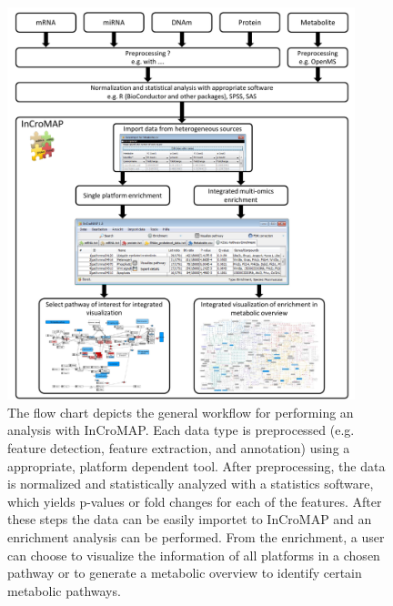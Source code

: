 \documentclass[final,5p,times,twocolumn]{elsarticle}
\begin{document}
\begin{figure}
\center
\includegraphics[width=0.9\textwidth]{InCroMAP_workflow.pdf}
\caption{The flow chart depicts the general workflow for performing an analysis with InCroMAP. Each data type is preprocessed (e.g. feature detection, feature extraction, and annotation) using a appropriate, platform dependent tool. After preprocessing, the data is normalized and statistically analyzed with a statistics software, which yields p-values or fold changes for each of the features. After these steps the data can be easily importet to InCroMAP and an enrichment analysis can be performed. From the enrichment, a user can choose to visualize the information of all platforms in a chosen pathway or to generate a metabolic overview to identify certain metabolic pathways.}
\label{fig:incromap-workflow}
\end{figure}
\end{document}
